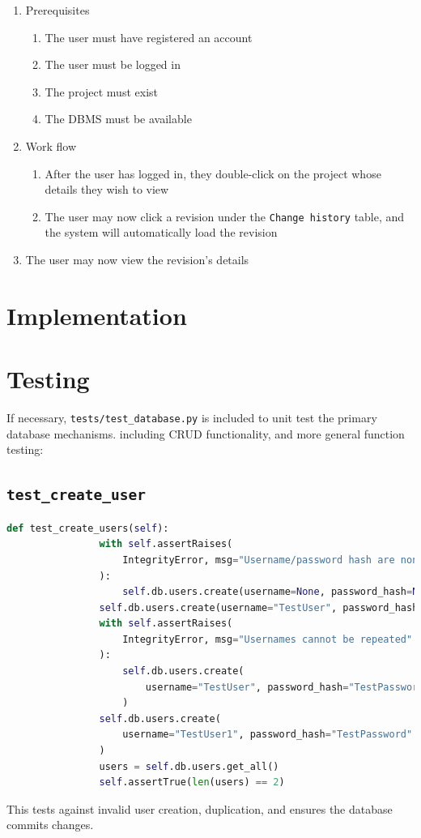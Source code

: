 \documentclass{report}
\begin{document}
	\begin{enumerate}
		\item Prerequisites
		\begin{enumerate}
			\item The user must have registered an account
			\item The user must be logged in
			\item The project must exist 
			\item The DBMS must be available
		\end{enumerate}
		\item Work flow
		\begin{enumerate}
			\item After the user has logged in, they double-click on the project whose details they wish
					  to view
			\item The user may now click a revision under the \verb|Change history| table, and the system
					  will automatically load the revision
		\end{enumerate}
		\item The user may now view the revision's details
	\end{enumerate}	
	
	\newpage
	\section{Implementation}
	
	\newpage
	\section{Testing}
	
	If necessary, \verb|tests/test_database.py| is included to unit test the primary database mechanisms.
	including CRUD functionality, and more general function testing:
	
	\subsection{\texttt{test\_create\_user}}
	\vspace{1em}
	\begin{lstlisting}[language=Python]
		def test_create_users(self):
				with self.assertRaises(
					IntegrityError, msg="Username/password hash are non-optional"
				):
					self.db.users.create(username=None, password_hash=None)
				self.db.users.create(username="TestUser", password_hash="TestPassword")
				with self.assertRaises(
					IntegrityError, msg="Usernames cannot be repeated"
				):
					self.db.users.create(
						username="TestUser", password_hash="TestPassword"
					)
				self.db.users.create(
					username="TestUser1", password_hash="TestPassword"
				)
				users = self.db.users.get_all()
				self.assertTrue(len(users) == 2)
	\end{lstlisting}
	\vspace{1em}
	This tests against invalid user creation, duplication, and ensures the database commits changes.
	
\end{document}
